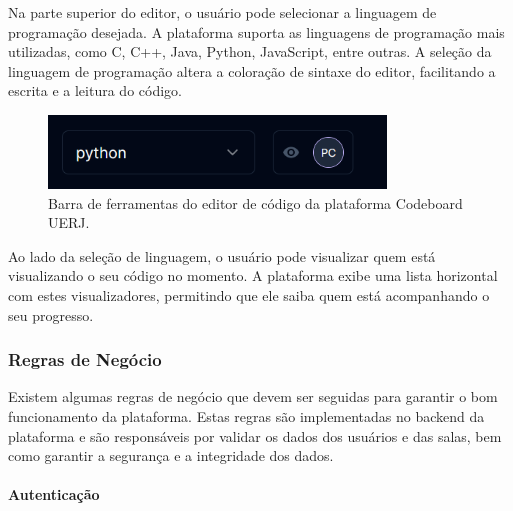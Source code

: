 Na parte superior do editor, o usuário pode selecionar a linguagem de programação desejada. A plataforma suporta as linguagens de programação mais utilizadas, como C, C++, Java, Python, JavaScript, entre outras. A seleção da linguagem de programação altera a coloração de sintaxe do editor, facilitando a escrita e a leitura do código.

\begin{figure}[H]
    \centering
    \includegraphics[width=0.8\textwidth]{assets/codeboard/code-editor-toolbar.png}
    \caption{Barra de ferramentas do editor de código da plataforma Codeboard UERJ.}
    \label{fig:code-editor-toolbar}
\end{figure}

Ao lado da seleção de linguagem, o usuário pode visualizar quem está visualizando o seu código no momento. A plataforma exibe uma lista horizontal com estes visualizadores, permitindo que ele saiba quem está acompanhando o seu progresso.


\subsubsection{Regras de Negócio}

Existem algumas regras de negócio que devem ser seguidas para garantir o bom funcionamento da plataforma. Estas regras são implementadas no backend da plataforma e são responsáveis por validar os dados dos usuários e das salas, bem como garantir a segurança e a integridade dos dados.

\paragraph{Autenticação}

